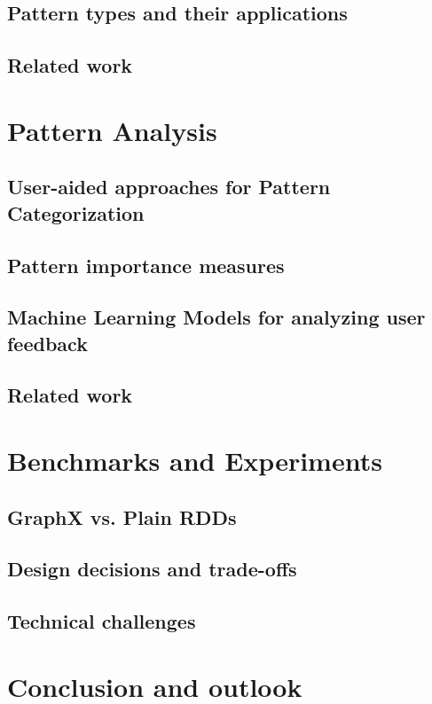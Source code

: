 \documentclass[
        a4paper,     %
        titlepage,   %
        oneside,     %
        parskip      %
        ]{scrartcl}  %
\begin{document}
    \subsection{Pattern types and their applications}
    \subsection{Related work}
    \pagebreak

  \section{Pattern Analysis}
    \subsection{User-aided approaches for Pattern Categorization}
    \subsection{Pattern importance measures}
    \subsection{Machine Learning Models for analyzing user feedback}
    \subsection{Related work}
    \pagebreak

  \section{Benchmarks and Experiments}
    \subsection{GraphX vs. Plain RDDs}
    \subsection{Design decisions and trade-offs}
    \subsection{Technical challenges}
    \pagebreak

  \section{Conclusion and outlook}

  \clearpage
  
\end{document}
